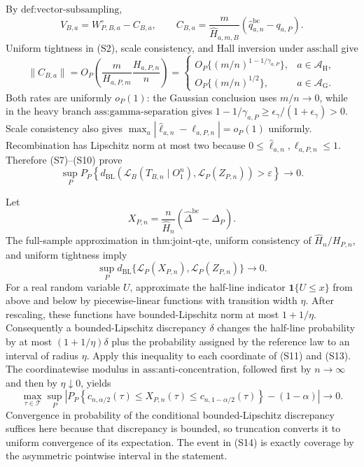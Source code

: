 By \(\text{def:vector-subsampling}\),
\[
V_{B,a}=W_{P,B,a}^{\circ}-C_{B,a},
\qquad
C_{B,a}=\frac m{\widehat H_{a,m,B}}
(\widehat q_{a,n}^{\mathrm{bc}}-q_{a,P}).
\tag{S9}
\]
Uniform tightness in (S2), scale consistency, and Hall inversion under \(\text{ass:hall}\) give
\[
\|C_{B,a}\|=O_P\!\left(\frac m{H_{a,P,m}}\frac{H_{a,P,n}}n\right)
=\begin{cases}
O_P\{(m/n)^{1-1/\gamma_{a,P}}\},&a\in\mathcal A_{\mathrm H},\\
O_P\{(m/n)^{1/2}\},&a\in\mathcal A_{\mathrm G}.
\end{cases}
\tag{S10}
\]
Both rates are uniformly \(o_P(1)\): the Gaussian conclusion uses \(m/n\to0\), while in the heavy branch \(\text{ass:gamma-separation}\) gives
\(1-1/\gamma_{a,P}\ge\epsilon_\gamma/(1+\epsilon_\gamma)>0\). Scale consistency also gives
\(\max_a|\widehat\ell_{a,n}-\ell_{a,P,n}|=o_P(1)\) uniformly. Recombination has Lipschitz norm at most two because \(0\le\widehat\ell_{a,n},\ell_{a,P,n}\le1\). Therefore (S7)--(S10) prove
\[
\sup_PP_P\!\left\{
d_{\mathrm{BL}}\!\left(
\mathcal L_B(T_{B,n}\mid O_1^n),
\mathcal L_P(Z_{P,n})\right)>\varepsilon\right\}\longrightarrow0.
\tag{S11}
\]

Let
\[
X_{P,n}=\frac n{\widehat H_n}(\widehat\Delta^{\mathrm{bc}}-\Delta_P).
\tag{S12}
\]
The full-sample approximation in \(\text{thm:joint-qte}\), uniform consistency of \(\widehat H_n/H_{P,n}\), and uniform tightness imply
\[
\sup_Pd_{\mathrm{BL}}\{\mathcal L_P(X_{P,n}),\mathcal L_P(Z_{P,n})\}\to0.
\tag{S13}
\]
For a real random variable \(U\), approximate the half-line indicator \(\mathbf1\{U\le x\}\) from above and below by piecewise-linear functions with transition width \(\eta\). After rescaling, these functions have bounded-Lipschitz norm at most \(1+1/\eta\). Consequently a bounded-Lipschitz discrepancy \(\delta\) changes the half-line probability by at most \((1+1/\eta)\delta\) plus the probability assigned by the reference law to an interval of radius \(\eta\). Apply this inequality to each coordinate of (S11) and (S13). The coordinatewise modulus in \(\text{ass:anti-concentration}\), followed first by \(n\to\infty\) and then by \(\eta\downarrow0\), yields
\[
\max_{\tau\in\mathcal T}\sup_P\left|
P_P\!\left\{
c_{n,\alpha/2}(\tau)\le X_{P,n}(\tau)
\le c_{n,1-\alpha/2}(\tau)\right\}-(1-\alpha)
\right|\to0.
\tag{S14}
\]
Convergence in probability of the conditional bounded-Lipschitz discrepancy suffices here because that discrepancy is bounded, so truncation converts it to uniform convergence of its expectation. The event in (S14) is exactly coverage by the asymmetric pointwise interval in the statement.

